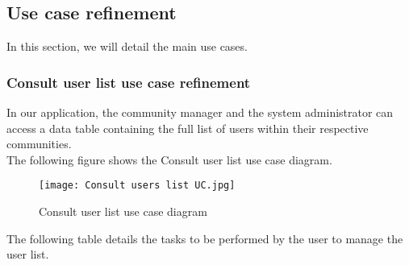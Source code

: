 \subsection{Use case refinement}
In this section, we will detail the main use cases.
\subsubsection{Consult user list use case refinement}
In our application, the community manager and the system administrator can access a data table containing the full list of users within their respective communities.\\
The following figure shows the Consult user list use case diagram.
\begin{figure}[H]%
    \center   
    \texttt{[image: Consult users list UC.jpg]}
    \caption{Consult user list use case diagram}
\end{figure}
The following table details the tasks to be performed by the user to manage the user list.

